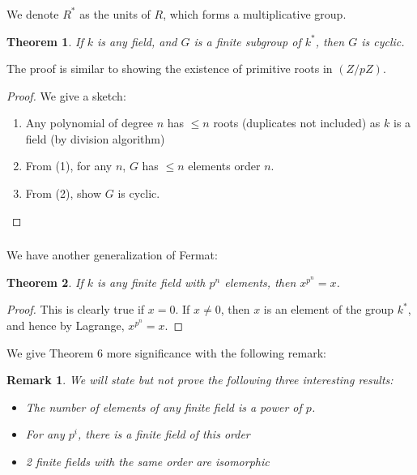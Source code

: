 \documentclass{article}
\newtheorem{theorem}{Theorem}
\newtheorem*{remark}{Remark}
\begin{document}
\subsubsection{}
We denote $R^{*}$ as the units of $R$, which forms a multiplicative group.
\begin{theorem}
    If $k$ is any field, and $G$ is a finite subgroup of $k^{*}$, then $G$ is cyclic.
\end{theorem}
The proof is similar to showing the existence of primitive roots in $(Z/pZ)$.
\begin{proof}
We give a sketch:
\begin{enumerate}
    \item Any polynomial of degree $n$ has $\leq n$ roots (duplicates not included) as $k$ is a field (by division algorithm)
    \item From (1), for any $n$, $G$ has $\leq n$ elements order $n$.
    \item From (2), show $G$ is cyclic.
\end{enumerate}
\end{proof}

\subsubsection{}
We have another generalization of Fermat:
\begin{theorem}
    If $k$ is any finite field with $p^{n}$ elements, then $x^{p^{n}} = x$.
\end{theorem}
\begin{proof}
This is clearly true if $x = 0$. If $x \neq 0$, then $x$ is an element of the group $k^{*}$, and hence by Lagrange, $x^{p^{n}} = x$.
\end{proof}
We give Theorem 6 more significance with the following remark:
\begin{remark}
    We will state but not prove the following three interesting results:
    \begin{itemize}
        \item The number of elements of any finite field is a power of $p$.
        \item For any $p^{i}$, there is a finite field of this order
        \item 2 finite fields with the same order are isomorphic
    \end{itemize}
\end{remark}
\end{document}
